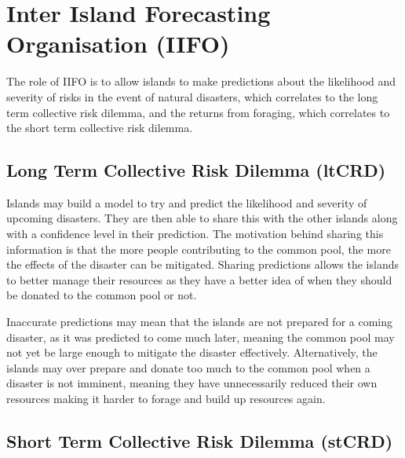 \chapter{Inter Island Forecasting Organisation (IIFO)}

The role of IIFO is to allow islands to make predictions about the likelihood and severity of risks in the event of natural disasters, which correlates to the long term collective risk dilemma, and the returns from foraging, which correlates to the short term collective risk dilemma.

\section{Long Term Collective Risk Dilemma (ltCRD)}
\label{sec:IIFO:ltCRD}


Islands may build a model to try and predict the likelihood and severity of upcoming disasters. They are then able to share this with the other islands along with a confidence level in their prediction. The motivation behind sharing this information is that the more people contributing to the common pool, the more the effects of the disaster can be mitigated. Sharing predictions allows the islands to better manage their resources as they have a better idea of when they should be donated to the common pool or not.

Inaccurate predictions may mean that the islands are not prepared for a coming disaster, as it was predicted to come much later, meaning the common pool may not yet be large enough to mitigate the disaster effectively. Alternatively, the islands may over prepare and donate too much to the common pool when a disaster is not imminent, meaning they have unnecessarily reduced their own resources making it harder to forage and build up resources again.

\section{Short Term Collective Risk Dilemma (stCRD)}
\label{sec:IIFO:stCRD}

